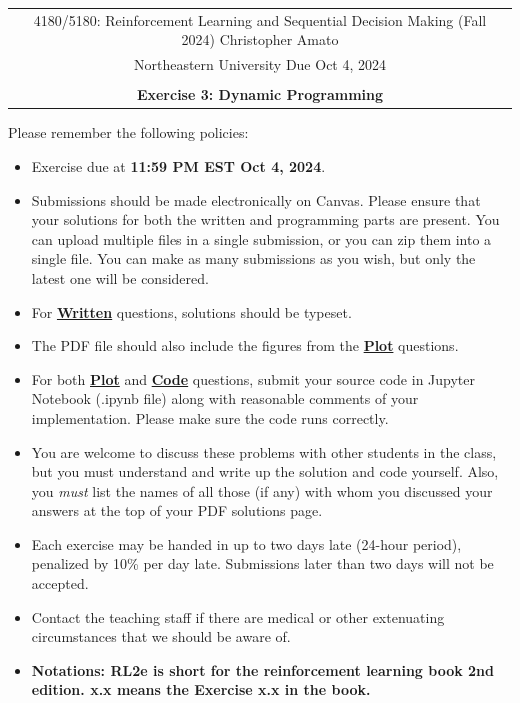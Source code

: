 \documentclass{article}
\begin{document}
\begin{center}
	\begin{tabular}{|c|}
		\hline
		4180/5180: Reinforcement Learning and Sequential Decision Making (Fall 2024) \hspace{1cm} Christopher Amato \\
		Northeastern University \hfill  Due Oct 4, 2024                                                    \\\\
		{\bfseries \large Exercise 3: Dynamic Programming}                                    \\ \hline
	\end{tabular}
\end{center}

Please remember the following policies:
\begin{itemize}
	\item Exercise due at \textbf{11:59 PM EST Oct 4, 2024}.
	\item Submissions should be made electronically on Canvas. Please ensure that your solutions for both the written and programming parts are present. You can upload multiple files in a single submission, or you can zip them into a single file. You can make as many submissions as you wish, but only the latest one will be considered.
	\item For \uline{\textbf{Written}} questions, solutions should be typeset. 
	\item The PDF file should also include the figures from the \uline{\textbf{Plot}} questions.
	\item For both \uline{\textbf{Plot}} and \uline{\textbf{Code}} questions, submit your source code in Jupyter Notebook (.ipynb file) along with reasonable comments of your implementation. Please make sure the code runs correctly. 
	\item You are welcome to discuss these problems with other students in the class, but you must understand and write up the solution and code yourself. Also, you \textit{must} list the names of all those (if any) with whom you discussed your answers at the top of your PDF solutions page.
	\item Each exercise may be handed in up to two days late (24-hour period), penalized by 10\% per day late. Submissions later than two days will not be accepted.
	\item Contact the teaching staff if there are medical or other extenuating circumstances that we should be aware of.
	\item \textbf{Notations: RL2e is short for the reinforcement learning book 2nd edition. x.x means the Exercise x.x in the book.}
\end{itemize}
\end{document}
